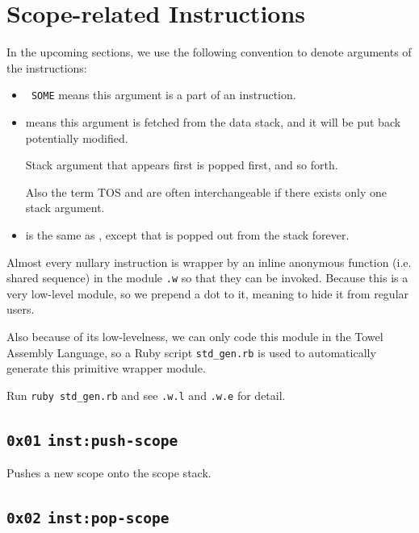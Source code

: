 \documentclass{report}
\newcommand{\mtilde}[1]{\textasciitilde}
\newcommand{\marg}[1]{\texttt{\mtilde ~#1}}
\newcommand{\inst}[1] {\texttt{inst:#1}}
\begin{document}
\section{Scope-related Instructions}

\begin{mdframed}[style=hint]
  In the upcoming sections, we use the following convention to denote arguments of the instructions:

  \begin{itemize}
  \item \marg{SOME} means this argument is a part of an instruction.
  \item {} means this argument is fetched from the data stack, and it will be put back potentially modified.

Stack argument that appears first is popped first, and so forth.

Also the term TOS and  are often interchangeable if there exists only one stack argument.
  \item {} is the same as , except that  is popped out from the stack forever.
  \end{itemize}
\end{mdframed}

\begin{mdframed}[style=hint]
Almost every nullary instruction is wrapper by an inline anonymous function (i.e. shared sequence) in the module \texttt{.w} so that they can be invoked. Because this is a very low-level module, so we prepend a dot to it, meaning to hide it from regular users.

Also because of its low-levelness, we can only code this module in the Towel Assembly Language, so a Ruby script \texttt{std\_gen.rb} is used to automatically generate this primitive wrapper module.

Run \texttt{ruby std\_gen.rb} and see \texttt{.w.l} and \texttt{.w.e} for detail.
\end{mdframed}

\subsection{\texttt{0x01} \inst{push-scope}}

Pushes a new scope onto the scope stack.

\subsection{\texttt{0x02} \inst{pop-scope}}
\end{document}
